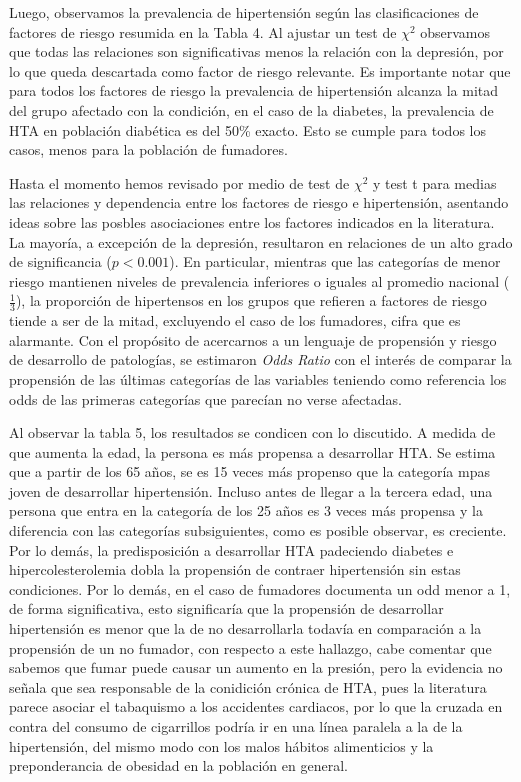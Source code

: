 \documentclass{aa}
\begin{document}
Luego, observamos la prevalencia de hipertensión según las clasificaciones de factores de riesgo resumida en la Tabla 4. Al ajustar un test de $\chi^2$ observamos que todas las relaciones son significativas menos la relación con la depresión, por lo que queda descartada como factor de riesgo relevante. Es importante notar que para todos los factores de riesgo la prevalencia de hipertensión alcanza la mitad del grupo afectado con la condición, en el caso de la diabetes, la prevalencia de HTA en población diabética es del 50\% exacto. Esto se cumple para todos los casos, menos para la población de fumadores. 

Hasta el momento hemos revisado por medio de test de $\chi^2$ y test t para medias las relaciones y dependencia entre los factores de riesgo e hipertensión, asentando ideas sobre las posbles asociaciones entre los factores indicados en la literatura. La mayoría, a excepción de la depresión, resultaron en relaciones de un alto grado de significancia ($p <0.001$). En particular, mientras que las categorías de menor riesgo mantienen niveles de prevalencia inferiores o iguales al promedio nacional ($\frac{1}{3}$), la proporción de hipertensos en los grupos que refieren a factores de riesgo tiende a ser de la mitad, excluyendo el caso de los fumadores, cifra que es alarmante. Con el propósito de acercarnos a un lenguaje de propensión y riesgo de desarrollo de patologías, se estimaron \textit{Odds Ratio} con el interés de comparar la propensión de las últimas categorías de las variables teniendo como referencia los odds de las primeras categorías que parecían no verse afectadas.

Al observar la tabla 5, los resultados se condicen con lo discutido. A medida de que aumenta la edad, la persona es más propensa a desarrollar HTA. Se estima que a partir de los 65 años, se es 15 veces más propenso que la categoría mpas joven de desarrollar hipertensión. Incluso antes de llegar a la tercera edad, una persona que entra en la categoría de los 25 años es 3 veces más propensa y la diferencia con las categorías subsiguientes, como es posible observar, es creciente. Por lo demás, la predisposición a desarrollar HTA padeciendo diabetes e hipercolesterolemia dobla la propensión de contraer hipertensión sin estas condiciones. Por lo demás, en el caso de fumadores documenta un odd menor a 1, de forma significativa, esto significaría que la propensión de desarrollar hipertensión es menor que la de no desarrollarla todavía en comparación a la propensión de un no fumador, con respecto a este hallazgo, cabe comentar que sabemos que fumar puede causar un aumento en la presión, pero la evidencia no señala que sea responsable de la conidición crónica de HTA, pues la literatura parece asociar el tabaquismo a los accidentes cardiacos, por lo que la cruzada en contra del consumo de cigarrillos podría ir en una línea paralela a la de la hipertensión, del mismo modo con los malos hábitos alimenticios y la preponderancia de obesidad en la población en general.
\end{document}
